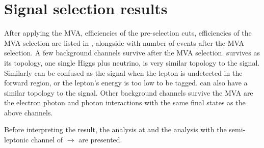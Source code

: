 \section{Signal selection results}
\label{sec:doubleHiggsSignalSelResult}
After applying the MVA, efficiencies of the pre-selection cuts, efficiencies of the MVA selection are listed in , alongside with number of events after the MVA selection. A few  background channels survive after the MVA selection. \eeTo{\Pquark \APquark \PHiggs \Pnu \APnu}   survives as its topology,  one single Higgs plus neutrino, is very similar topology  to the signal. Similarly \eeTo{ \Pquark \Pquark \Pquark \Pquark \Plepton \Pnu} can be confused as the signal when the lepton is undetected in the forward region, or the lepton's energy is too low to be tagged.  \eeTo{ \Pquark \Pquark \Pquark \Pquark \Pnu \APnu} can also have a similar topology to the signal. Other background channels survive the MVA are the electron photon and photon interactions with the same final states as the above channels.

Before interpreting the result, the analysis at  and  the analysis with the semi-leptonic channel of \eeToHH $\to$ \HepProcess{ \Pbottom \APbottom \PWplus \PWminus \Pnue \APnue} are presented.


